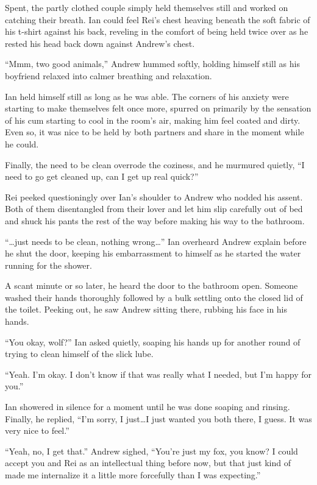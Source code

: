 Spent, the partly clothed couple simply held themselves still and worked on catching their breath. Ian could feel Rei's chest heaving beneath the soft fabric of his t-shirt against his back, reveling in the comfort of being held twice over as he rested his head back down against Andrew's chest.

``Mmm, two good animals,'' Andrew hummed softly, holding himself still as his boyfriend relaxed into calmer breathing and relaxation.

Ian held himself still as long as he was able. The corners of his anxiety were starting to make themselves felt once more, spurred on primarily by the sensation of his cum starting to cool in the room's air, making him feel coated and dirty. Even so, it was nice to be held by both partners and share in the moment while he could.

Finally, the need to be clean overrode the coziness, and he murmured quietly, ``I need to go get cleaned up, can I get up real quick?''

Rei peeked questioningly over Ian's shoulder to Andrew who nodded his assent. Both of them disentangled from their lover and let him slip carefully out of bed and shuck his pants the rest of the way before making his way to the bathroom.

``\ldots{}just needs to be clean, nothing wrong\ldots{}'' Ian overheard Andrew explain before he shut the door, keeping his embarrassment to himself as he started the water running for the shower.

A scant minute or so later, he heard the door to the bathroom open. Someone washed their hands thoroughly followed by a bulk settling onto the closed lid of the toilet. Peeking out, he saw Andrew sitting there, rubbing his face in his hands.

``You okay, wolf?'' Ian asked quietly, soaping his hands up for another round of trying to clean himself of the slick lube.

``Yeah. I'm okay. I don't know if that was really what I needed, but I'm happy for you.''

Ian showered in silence for a moment until he was done soaping and rinsing. Finally, he replied, ``I'm sorry, I just\ldots{}I just wanted you both there, I guess. It was very nice to feel.''

``Yeah, no, I get that.'' Andrew sighed, ``You're just my fox, you know? I could accept you and Rei as an intellectual thing before now, but that just kind of made me internalize it a little more forcefully than I was expecting.''

